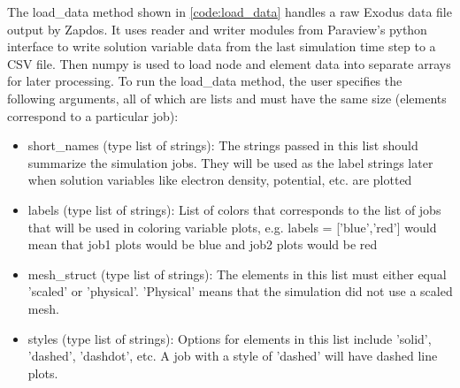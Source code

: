 The load\_data method shown in \cref{code:load_data} handles a raw Exodus data file output by Zapdos. It uses reader and writer modules from Paraview's \cite{paraview} python interface to write solution variable data from the last simulation time step to a CSV file. Then numpy is used to load node and element data into separate arrays for later processing. To run the load\_data method, the user specifies the following arguments, all of which are lists and must have the same size (elements correspond to a particular job):

\begin{itemize}
\label{list:load_dat_args}
  \item short\_names (type list of strings): The strings passed in this list should summarize the simulation jobs. They will be used as the label strings later when solution variables like electron density, potential, etc. are plotted
  \item labels (type list of strings): List of colors that corresponds to the list of jobs that will be used in coloring variable plots, e.g. labels = ['blue','red'] would mean that job1 plots would be blue and job2 plots would be red
  \item mesh\_struct (type list of strings): The elements in this list must either equal 'scaled' or 'physical'. 'Physical' means that the simulation did not use a scaled mesh.
  \item styles (type list of strings): Options for elements in this list include 'solid', 'dashed', 'dashdot', etc. A job with a style of 'dashed' will have dashed line plots.
\end{itemize}

